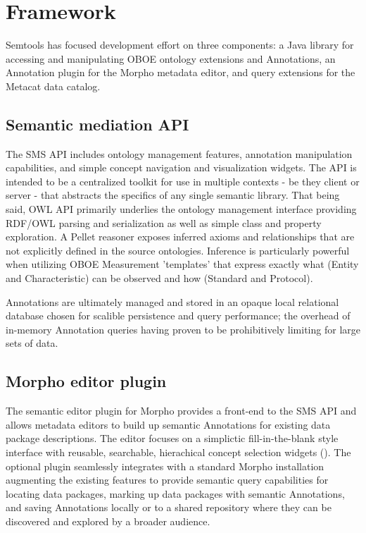 \section{Framework}

Semtools has focused development effort on three components:
a Java library for accessing and manipulating OBOE ontology extensions and Annotations,
an Annotation plugin for the Morpho metadata editor, and query extensions for the Metacat data catalog.

\subsection{Semantic mediation API}
The SMS API includes ontology management features, annotation manipulation capabilities, and simple concept navigation and visualization widgets. The API is intended to be a centralized toolkit for use in multiple contexts - be they client or server - that abstracts the specifics of any single semantic library. That being said, OWL API primarily underlies the ontology management interface providing RDF/OWL parsing and serialization as well as simple class and property exploration. A Pellet reasoner exposes inferred axioms and relationships that are not explicitly defined in the source ontologies. Inference is particularly powerful when utilizing OBOE Measurement 'templates' that express exactly what (Entity and Characteristic) can be observed and how (Standard and Protocol). 

Annotations are ultimately managed and stored in an opaque local relational database chosen for scalible persistence and query performance; the overhead of in-memory Annotation queries having proven to be prohibitively limiting for large sets of data.

\subsection{Morpho editor plugin}
The semantic editor plugin for Morpho provides a front-end to the SMS API and allows metadata editors to build up semantic Annotations for existing data package descriptions. The editor focuses on a simplictic fill-in-the-blank style interface with reusable, searchable, hierachical concept selection widgets (). The optional plugin seamlessly integrates with a standard Morpho installation augmenting the existing features to provide semantic query capabilities for locating data packages, marking up data packages with semantic Annotations, and saving Annotations locally or to a shared repository where they can be discovered and explored by a broader audience.

